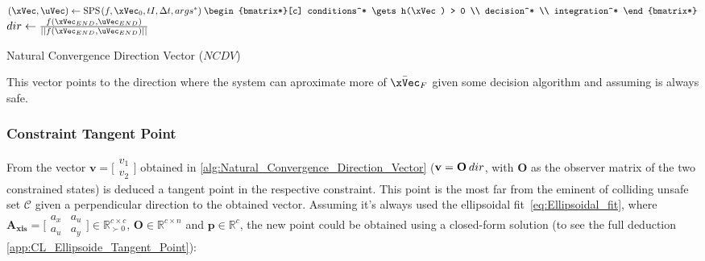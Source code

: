   \begin{algorithm}
    $(\xVec, \uVec) \gets \text{SPS}\hspace{0.1em}(f, \xVec_0, tI, \Delta t, args^*) \hspace{0.25em} \begin{bmatrix*}[c]  conditions^* \gets h(\xVec) > 0 \\ decision^* \\ integration^* \end{bmatrix*}$  
    $dir \gets \frac{f(\xVec_{END}, \uVec_{END})}{||f(\xVec_{END}, \uVec_{END})||}$ 
    \caption{Natural Convergence Direction Vector (\(NCDV\))} \label{alg:Natural_Convergence_Direction_Vector}
  \end{algorithm}

  This vector points to the direction where the system can aproximate more of \(\bar{\xVec}_F\) given some decision algorithm and assuming is always safe.


\subsubsection{Constraint Tangent Point}
\label{subsubsec:Constraint_Tangent_Point}

From the vector \(\mathbf{v} = \bigl[\begin{smallmatrix} v_1\\ v_2 \end{smallmatrix} \bigr]\) obtained in \ref{alg:Natural_Convergence_Direction_Vector} (\(\mathbf{v} = \mathbf{O} \hspace{0.2em} dir\), with \(\mathbf{O}\) as the observer matrix of the two constrained states) is deduced a tangent point in the respective constraint. This point is the most far from the eminent of colliding unsafe set \(\mathcal{C}\) given a perpendicular direction to the obtained vector.%
 Assuming it's always used the ellipsoidal fit~\ref{eq:Ellipsoidal_fit}, where \(\mathbf{A_{xis}} = \bigl[\begin{smallmatrix} a_x&a_u \\ a_u&a_y \end{smallmatrix} \bigr] \in \mathbb{R}^{c \times c}_{\succ 0}\), \(\mathbf{O} \in \mathbb{R}^{c \times n}\) and \(\mathbf{p} \in \mathbb{R}^{c}\), the new point could be obtained using a closed-form solution (to see the full deduction \ref{app:CL_Ellipsoide_Tangent_Point}):


